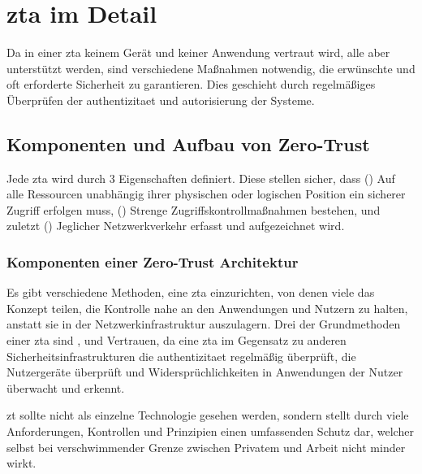 \newpage
\section[Zero-Trust Architektur im Detail]{\ac{zta} im Detail}\label{sec:zta-im-detail}
Da in einer \ac{zta} keinem Gerät und keiner Anwendung vertraut wird, alle aber unterstützt werden, sind verschiedene Maßnahmen notwendig, die erwünschte und oft erforderte Sicherheit zu garantieren.
Dies geschieht durch regelmäßiges Überprüfen der \gls{authentizitaet} und \gls{autorisierung} der Systeme.\autocite[\vglf][]{dsilvia-2021}

\subsection{Komponenten und Aufbau von Zero-Trust}\label{subsec:komponenten-und-aufbau-von-zero-trust}
Jede \ac{zta} wird durch 3 Eigenschaften definiert.
Diese stellen sicher, dass () Auf alle Ressourcen unabhängig ihrer physischen oder logischen Position ein sicherer Zugriff erfolgen muss, () Strenge Zugriffskontrollmaßnahmen bestehen, und zuletzt () Jeglicher Netzwerkverkehr erfasst und aufgezeichnet wird.\autocite[\vglf][]{dsilvia-2021}

\subsubsection{Komponenten einer Zero-Trust Architektur}
Es gibt verschiedene Methoden, eine \ac{zta} einzurichten, von denen viele das Konzept teilen, die Kontrolle nahe an den Anwendungen und Nutzern zu halten, anstatt sie in der Netzwerkinfrastruktur auszulagern.\autocite[\vglf][]{buck-2021}
Drei der Grundmethoden einer \ac{zta} sind ,  und Vertrauen, da eine \ac{zta} im Gegensatz zu anderen Sicherheitsinfrastrukturen die \gls{authentizitaet} regelmäßig überprüft, die Nutzergeräte überprüft und Widersprüchlichkeiten in Anwendungen der Nutzer überwacht und erkennt.\autocite[\vglf][]{dsilvia-2021}

\ac{zt} sollte nicht als einzelne Technologie gesehen werden, sondern stellt durch viele Anforderungen, Kontrollen und Prinzipien einen umfassenden Schutz dar, welcher selbst bei verschwimmender Grenze zwischen Privatem und Arbeit nicht minder wirkt.\autocite[\vglf][Was sind die Komponenten von Zero Trust]{akamai:online}

